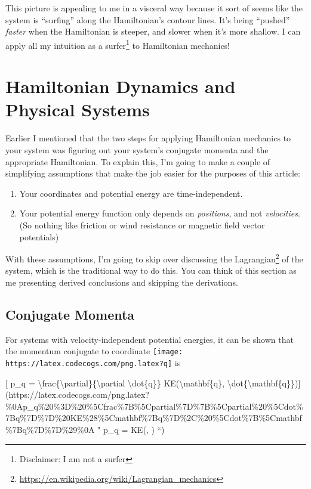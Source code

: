 \documentclass[]{article}
\renewcommand{\href}[2]{#2\footnote{\url{#1}}}
\begin{document}
This picture is appealing to me in a visceral way because it sort of seems like
the system is ``surfing'' along the Hamiltonian's contour lines. It's being
``pushed'' \emph{faster} when the Hamiltonian is steeper, and slower when it's
more shallow. I can apply all my intuition as a surfer\footnote{Disclaimer: I am
  not a surfer} to Hamiltonian mechanics!

\section{Hamiltonian Dynamics and Physical
Systems}\label{hamiltonian-dynamics-and-physical-systems}

Earlier I mentioned that the two steps for applying Hamiltonian mechanics to
your system was figuring out your system's conjugate momenta and the appropriate
Hamiltonian. To explain this, I'm going to make a couple of simplifying
assumptions that make the job easier for the purposes of this article:

\begin{enumerate}
\def\labelenumi{\arabic{enumi}.}
\tightlist
\item
  Your coordinates and potential energy are time-independent.
\item
  Your potential energy function only depends on \emph{positions}, and not
  \emph{velocities}. (So nothing like friction or wind resistance or magnetic
  field vector potentials)
\end{enumerate}

With these assumptions, I'm going to skip over discussing the
\href{https://en.wikipedia.org/wiki/Lagrangian_mechanics}{Lagrangian} of the
system, which is the traditional way to do this. You can think of this section
as me presenting derived conclusions and skipping the derivations.

\subsection{Conjugate Momenta}\label{conjugate-momenta}

For systems with velocity-independent potential energies, it can be shown that
the momentum conjugate to coordinate
\texttt{[image: https://latex.codecogs.com/png.latex?q]} is

{[} p\_q =
\textbackslash{}frac\{\textbackslash{}partial\}\{\textbackslash{}partial
\textbackslash{}dot\{q\}\} KE(\textbackslash{}mathbf\{q\},
\textbackslash{}dot\{\textbackslash{}mathbf\{q\}\}){]}(https://latex.codecogs.com/png.latex?\%0Ap\_q\%20\%3D\%20\%5Cfrac\%7B\%5Cpartial\%7D\%7B\%5Cpartial\%20\%5Cdot\%7Bq\%7D\%7D\%20KE\%28\%5Cmathbf\%7Bq\%7D\%2C\%20\%5Cdot\%7B\%5Cmathbf\%7Bq\%7D\%7D\%29\%0A
" p\_q =  KE(, ) ``)
\end{document}
